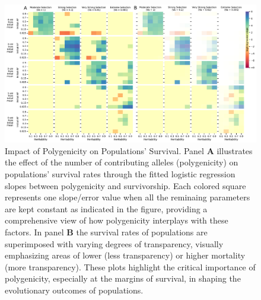 \documentclass{article}
\begin{document}
\begin{figure}[b]
    \centering
    \includegraphics[width=1\textwidth]{figures/poly_panel_figure_2plots.pdf}
    \caption{Impact of Polygenicity on Populations' Survival. Panel \textbf{A} illustrates the effect of the number of contributing alleles (polygenicity) on populations' survival rates through the fitted logistic regression slopes between polygenicity and survivorship. Each colored square represents one slope/error value when all the reminaing parameters are kept constant as indicated in the figure, providing a comprehensive view of how polygenicity interplays with these factors. In panel \textbf{B} the survival rates of populations are superimposed with varying degrees of transparency, visually emphasizing areas of lower (less transparency) or higher mortality (more transparency). These plots highlight the critical importance of polygenicity, especially at the margins of survival, in shaping the evolutionary outcomes of populations.}
    \label{fig:poly_panel_figure}
\end{figure}
\end{document}
